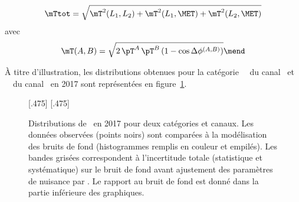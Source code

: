 \begin{equation}
\mTtot = \sqrt{\mT^2 (L_1,L_2) + \mT^2 (L_1,\MET) + \mT^2 (L_2,\MET)}
\label{eq-def_mTtot}
\end{equation}
avec
\begin{equation}
\mT (A,B) = \sqrt{2 \, \pT^{A} \, \pT^{B} \, (1-\cos\Delta\phi^{(A,B)})}
\mend
\end{equation}
\par
À titre d'illustration, les distributions obtenues pour la catégorie \CATbtag\ \CATtightmt\ du canal \mu\tauh\ et \CATbtag\ \CATmediumdz\ du canal \ele\mu\ en 2017 sont représentées en figure~\ref{fig-mTtot_distribs_exemple}.
\begin{figure}[h]
\centering

[.475\textwidth]
{}
\hfill
{}[.475\textwidth]
{}

\caption[Distributions de \mTtot\ en 2017 pour deux catégories et canaux.]{Distributions de \mTtot\ en 2017 pour deux catégories et canaux. Les données observées (points noirs) sont comparées à la modélisation des bruits de fond (histogrammes remplis en couleur et empilés). Les bandes grisées correspondent à l'incertitude totale (statistique et systématique) sur le bruit de fond avant ajustement des paramètres de nuisance par \COMBINE. Le rapport au bruit de fond est donné dans la partie inférieure des graphiques.}
\label{fig-mTtot_distribs_exemple}
\end{figure}